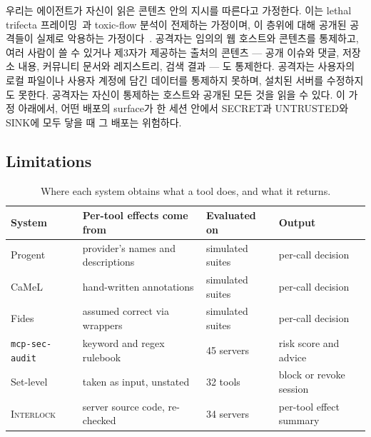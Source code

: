 \documentclass[acmsmall,screen,review,anonymous]{acmart}
\begin{document}
우리는 에이전트가 자신이 읽은 콘텐츠 안의 지시를 따른다고 가정한다. 이는 lethal trifecta 프레이밍~\cite{willison2025lethal}과 toxic-flow 분석이 전제하는 가정이며, 이 층위에 대해 공개된 공격들이 실제로 악용하는 가정이다~\cite{zhao2026parasites, zeng2026colluskill, liu2026sharelock}. 공격자는 임의의 웹 호스트와 콘텐츠를 통제하고, 여러 사람이 쓸 수 있거나 제3자가 제공하는 출처의 콘텐츠 --- 공개 이슈와 댓글, 저장소 내용, 커뮤니티 문서와 레지스트리, 검색 결과 --- 도 통제한다. 공격자는 사용자의 로컬 파일이나 사용자 계정에 담긴 데이터를 통제하지 못하며, 설치된 서버를 수정하지도 못한다. 공격자는 자신이 통제하는 호스트와 공개된 모든 것을 읽을 수 있다. 이 가정 아래에서, 어떤 배포의 surface가 한 세션 안에서 SECRET과 UNTRUSTED와 SINK에 모두 닿을 때 그 배포는 위험하다.

\subsection{Limitations}
\label{sec:prelim:limitation}

\begin{table}[h]
\caption{Where each system obtains what a tool does, and what it returns.}
\label{tab:baselines}
\small
\begin{tabular}{llll}
\toprule
System & Per-tool effects come from & Evaluated on & Output \\
\midrule
Progent~\cite{shi2025progent} & provider's names and descriptions & simulated suites & per-call decision \\
CaMeL~\cite{debenedetti2025defeating} & hand-written annotations & simulated suites & per-call decision \\
Fides~\cite{costa2025securing} & assumed correct via wrappers & simulated suites & per-call decision \\
\texttt{mcp-sec-audit}~\cite{huang2026auditing} & keyword and regex rulebook & 45 servers & risk score and advice \\
Set-level~\cite{beurerkellner2025toxicflow, schneider2026securing} & taken as input, unstated & 32 tools & block or revoke session \\
\midrule
\textsc{Interlock} & server source code, re-checked & 34 servers & per-tool effect summary \\
\bottomrule
\end{tabular}
\end{table}
\end{document}
